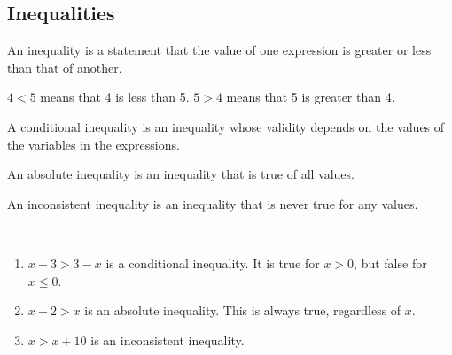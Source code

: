 \documentclass[crop=false,class=book,oneside]{standalone}
\begin{document}
        \subsection{Inequalities}
            \begin{definition}
                An inequality is a statement that the value of
                one expression is greater or less than that
                of another.
            \end{definition}
            \begin{example}
                $4<5$ means that 4 is less than 5.
                $5>4$ means that 5 is greater than 4.
            \end{example}
            \begin{definition}
                A conditional inequality is an inequality
                whose validity depends on the values
                of the variables in the expressions.
            \end{definition}
            \begin{definition}
                An absolute inequality is an inequality
                that is true of all values.
            \end{definition}
            \begin{definition}
                An inconsistent inequality is an inequality
                that is never true for any values.
            \end{definition}
            \begin{example}
                \
                \begin{enumerate}
                    \item $x+3>3-x$ is a conditional inequality.
                        It is true for $x>0$, but false for
                        ${x}\leq{0}$.
                    \item $x+2>x$ is an absolute inequality. This
                        is always true, regardless of $x$.
                    \item $x>x+10$ is an inconsistent inequality.
                \end{enumerate}
            \end{example}
\end{document}
